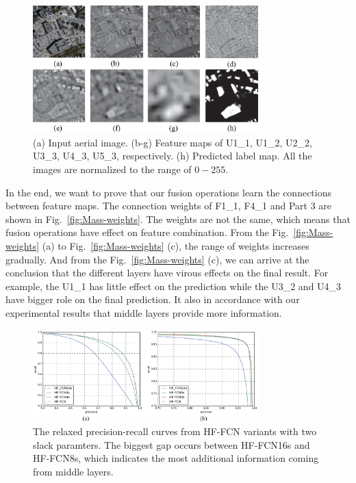 \begin{figure}
\begin{center}
\includegraphics[width=8.7cm]{Figures/feature_maps.eps}
\caption{(a) Input aerial image. (b-g) Feature maps of U1\_1, U1\_2, U2\_2, U3\_3, U4\_3, U5\_3, respectively. (h) Predicted label map. All the images are normalized to the range of ${0-255}$.}
\label{fig:feature_maps}
\end{center}
\end{figure}


In the end, we want to prove that our fusion operations learn the connections between feature maps. The connection weights of F1\_1, F4\_1 and Part 3 are shown in Fig.~\ref{fig:Mass-weights}.
The weights are not the same, which means that fusion operations have effect on feature combination.
From the Fig.~\ref{fig:Mass-weights} (a) to Fig.~\ref{fig:Mass-weights} (c), the range of weights increases gradually. And from the Fig.~\ref{fig:Mass-weights} (c), we can arrive at the conclusion that the different layers have virous effects on the final result.
For example, the U1\_1 has little effect on the prediction while the U3\_2 and U4\_3 have bigger role on the final prediction.
It also in accordance with our experimental results that middle layers provide more information.

\begin{figure}
\centering
\includegraphics[width=8.7cm]{Figures/HF-FCN-variant-PR.eps}
\caption{The relaxed precision-recall curves from HF-FCN variants with two slack paramters. The biggest gap occurs between HF-FCN16s and HF-FCN8s, which indicates the most additional information coming from middle layers.}
\label{fig:Mass-variants-PR}
\end{figure}

